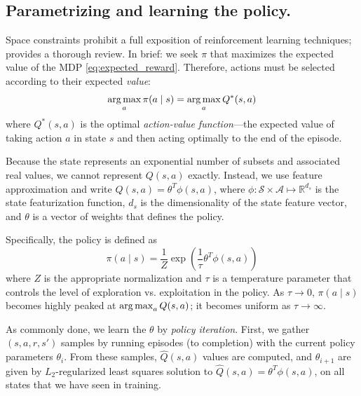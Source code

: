 \subsection{Parametrizing and learning the policy.}

Space constraints prohibit a full exposition of reinforcement learning techniques; \cite{Sutton1998} provides a thorough review.
In brief: we seek $\pi$ that maximizes the expected value of the MDP \eqref{eq:expected_reward}.
Therefore, actions must be selected according to their expected \emph{value}:
\begin{align*}
\operatorname*{arg\,max}_a \pi(a \mid s) = \operatorname*{arg\,max}_a Q^*(s,a)
\end{align*}
where $Q^*(s,a)$ is the optimal \emph{action-value function}---the expected value of taking action $a$ in state $s$ and then acting optimally to the end of the episode.

Because the state represents an exponential number of subsets and associated real values, we cannot represent $Q(s,a)$ exactly.
Instead, we use feature approximation and write $Q(s,a) = \theta^T \phi(s, a)$,  where $\phi: \mathcal{S} \times \mathcal{A} \mapsto \mathbb{R}^{d_s}$ is the state featurization function, $d_s$ is the dimensionality of the state feature vector, and $\theta$ is a vector of weights that defines the policy.

Specifically, the policy is defined as
\begin{equation}
\pi(a \mid s) = \frac{1}{Z} \exp\left(\frac{1}{\tau} \theta^T \phi(s, a)\right)
\end{equation}
where $Z$ is the appropriate normalization and $\tau$ is a temperature parameter that controls the level of exploration vs. exploitation in the policy.
As $\tau \rightarrow 0$, ${\pi(a \mid s)}$ becomes highly peaked at $\operatorname*{arg\,max}_a Q(s,a)$; it becomes uniform as $\tau \rightarrow \infty$.

As commonly done, we learn the $\theta$ by \emph{policy iteration}.
First, we gather $(s, a, r, s')$ samples by running episodes (to completion) with the current policy parameters $\theta_i$.
From these samples, $\hat{Q}(s, a)$ values are computed, and $\theta_{i+1}$ are given by $L_2$-regularized least squares solution to $\hat{Q}(s, a) = \theta^T \phi(s, a)$, on all states that we have seen in training.

